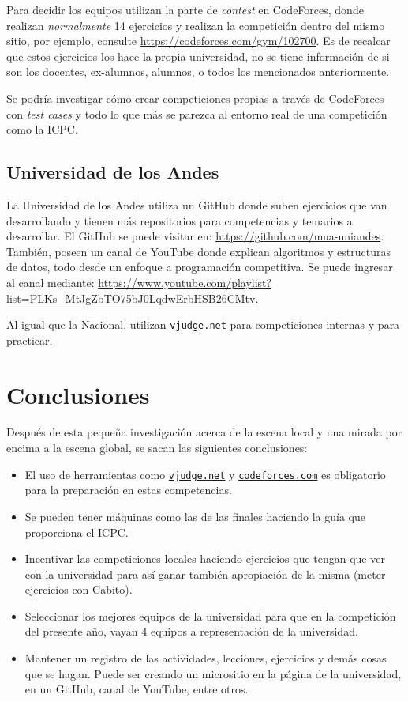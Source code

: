 \documentclass[12pt]{article}
\begin{document}
Para decidir los equipos utilizan la parte de \textit{contest} en CodeForces, donde realizan \textit{normalmente} 14 ejercicios y realizan la competición dentro del mismo sitio, por ejemplo, consulte \url{https://codeforces.com/gym/102700}. Es de recalcar que estos ejercicios los hace la propia universidad, no se tiene información de si son los docentes, ex-alumnos, alumnos, o todos los mencionados anteriormente.

Se podría investigar cómo crear competiciones propias a través de CodeForces con \textit{test cases} y todo lo que más se parezca al entorno real de una competición como la ICPC.

\subsection{Universidad de los Andes}

La Universidad de los Andes utiliza un GitHub donde suben ejercicios que van desarrollando y tienen más repositorios para competencias y temarios a desarrollar. El GitHub se puede visitar en: \url{https://github.com/mua-uniandes}. También, poseen un canal de YouTube donde explican algoritmos y estructuras de datos, todo desde un enfoque a programación competitiva. Se puede ingresar al canal mediante: \url{https://www.youtube.com/playlist?list=PLKs_MtJgZbTO75bJ0LqdwErbHSB26CMtv}.

Al igual que la Nacional, utilizan \href{www.vjudge.net}{\texttt{vjudge.net}} para competiciones internas y para practicar.


\section{Conclusiones}

Después de esta pequeña investigación acerca de la escena local y una mirada por encima a la escena global, se sacan las siguientes conclusiones:


\begin{itemize}
\item El uso de herramientas como \href{www.vjudge.net}{\texttt{vjudge.net}} y \href{www.codeforces.com}{\texttt{codeforces.com}} es obligatorio para la preparación en estas competencias.
\item Se pueden tener máquinas como las de las finales haciendo la guía que proporciona el ICPC.
\item Incentivar las competiciones locales haciendo ejercicios que tengan que ver con la universidad para así ganar también apropiación de la misma (meter ejercicios con Cabito).
\item Seleccionar los mejores equipos de la universidad para que en la competición del presente año, vayan 4 equipos a representación de la universidad.
\item Mantener un registro de las actividades, lecciones, ejercicios y demás cosas que se hagan. Puede ser creando un micrositio en la página de la universidad, en un GitHub, canal de YouTube, entre otros.
\end{itemize}





\end{document}
